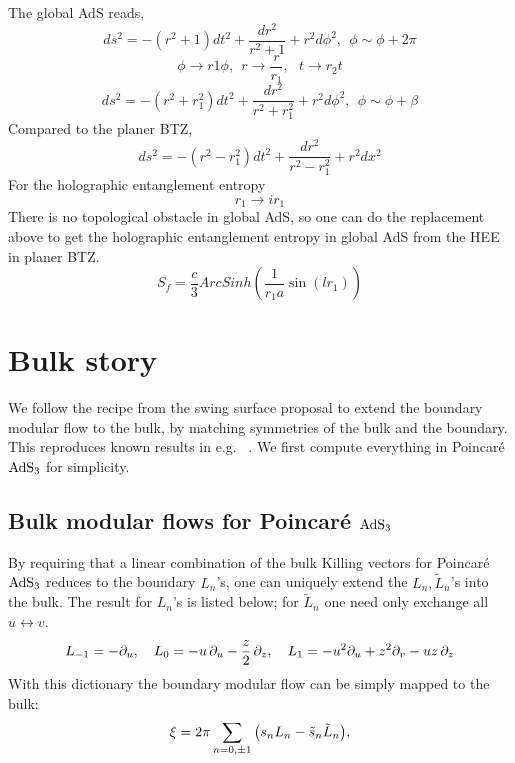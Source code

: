 \documentclass[11pt,a4paper]{article}
\begin{document}
	The global AdS reads,
	\begin{equation}
	 ds^2=-(r^2+1)dt^2+\frac{dr^2}{r^2+1}+r^2d\phi^2,\ \ \phi\sim\phi+2\pi
	\end{equation}
	\begin{equation}
	\phi\rightarrow r1\phi,\ \ r\rightarrow \frac{r}{r_1}, \ \ \ t\rightarrow r_2 t
	\end{equation}
	\begin{equation}
	 ds^2=-(r^2+r_1^2)dt^2+\frac{dr^2}{r^2+r_1^2}+r^2d\phi^2,\ \ \phi\sim\phi+\beta
	\end{equation}
	Compared to the planer BTZ,
	\begin{equation}
	ds^2=-(r^2-r_1^2)dt^2+\frac{dr^2}{r^2-r_1^2}+r^2dx^2
	\end{equation}
	For the holographic entanglement entropy
	\begin{equation}
	r_1\rightarrow ir_1
	\end{equation}
	There is no topological obstacle in global AdS, so one can do the replacement above to get the holographic entanglement entropy in global AdS from the HEE in planer BTZ.
	\begin{equation}
	S_f=\frac{c}{3}ArcSinh(\frac{1}{r_1a}\sin(lr_1))
	\end{equation}
	
	
\pagebreak

\section{Bulk story}
	We follow the recipe from the swing surface proposal \cite{Apolo:2020bld,Apolo:2020qjm} to extend the boundary modular flow to the bulk, by matching symmetries of the bulk and the boundary.  This reproduces known results in e.g.~\cite{Lashkari:2016idm,Czech:2019vih,Apolo:2020qjm} . We first compute everything in Poincar\'e $\mathrm{AdS}_3$ for simplicity. 
\subsection{Bulk modular flows for Poincar\'e $\mathrm{AdS}_3$}
	By requiring that a linear combination of the bulk Killing vectors for Poincar\'e $\mathrm{AdS}_3$ reduces to the boundary $L_n$'s, one can uniquely extend the $L_n,\tilde{L}_n$'s into the bulk. The result for $L_n$'s is listed below; for $\tilde{L}_n$ one need only exchange all $u\leftrightarrow v$.
	\begin{equation}
		L_{-1} = -\partial_{u},
	\quad
		L_0 = -u\,\partial_{u} - \frac{z}{2}\,\partial_{z},
	\quad
		L_1 = -u^2\partial_{u} + z^2 \partial_{v}
			- uz\,\partial_{z}
	\end{equation}
	With this dictionary the boundary modular flow can be simply mapped to the bulk:
	\begin{equation}
		\xi = 2\pi \sum_{n=0,\pm 1} \pqty{
				s_n L_n - \tilde{s}_n \tilde{L}_n
			},
	\end{equation}
	
\end{document}
